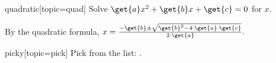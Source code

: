 
\begin{problem}{quadratic}[topic=quad]
	Solve $\get{a}x^2 + \get{b}x + \get{c} = 0$ for $x$.
	\begin{solution}
	By the quadratic formula,
	$x = \frac{-\get{b} \pm \sqrt{\get{b}^2 - 4 \cdot \get{a} \cdot \get{c}}}{2 \cdot \get{a}}.$
	\end{solution}
\end{problem}

\begin{problem}{picky}[topic=pick]
	Pick from the list: .
\end{problem}
